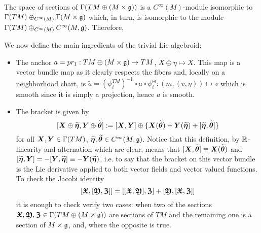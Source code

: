 The space of sections of $\Gamma(TM \oplus (M \times \mathfrak{g}))$ is a $C^\infty(M)$-module isomorphic to $\Gamma(TM) \oplus_{C^\infty(M)}\Gamma(M \times \mathfrak{g})$ which, in turn, is isomorphic to the module $\Gamma(TM) \oplus_{C^\infty(M)} C^\infty(M, \mathfrak{g})$. Therefore, 

We now define the main ingredients of the trivial Lie algebroid:
    \begin{itemize}
    \item The anchor $a = pr_1: TM \oplus (M \times \mathfrak{g}) \to TM$, $X \oplus \eta \mapsto X$. This map is a vector bundle map as it clearly respects the fibers and, locally on a neighborhood chart, is $\tilde a = (\psi^{TM}_i)^{-1} \circ a \circ \psi^{\oplus}_i: (m, (v, \eta)) \mapsto v$ which is smooth since it is simply a projection, hence $a$ is smooth.
    
    \item The bracket is given by 
    \[
        [\bm{X} \oplus \widetilde{\bm{\eta}}, \bm{Y} \oplus \widetilde{\bm{\theta}}] := [\bm{X}, \bm{Y}] \oplus \{\bm{X}(\widetilde{\bm{\theta}}) - \bm{Y}(\widetilde{\bm{\eta}}) + [\widetilde{\bm{\eta}}, \widetilde{\bm{\theta}}]\}
    \]
    for all $\bm{X}, \bm{Y} \in \Gamma(TM)$, $\widetilde{\bm{\eta}}, \widetilde{\bm{\theta}} \in C^\infty(M, \mathfrak{g})$.%
    Notice that this definition, by $\mathbb{R}$-linearity and alternation which are clear, means that $[\bm{X}, \widetilde{\bm{\theta}}] \equiv \bm{X}(\widetilde{\bm{\theta}})$ and $[\widetilde{\bm{\eta}}, \bm{Y}] = - [\bm{Y}, \widetilde{\bm{\eta}}] \equiv -\bm{Y}(\widetilde{\bm{\eta}})$, i.e. to say that the bracket on this vector bundle is the Lie derivative applied to both vector fields and vector valued functions. %
    To check the Jacobi identity
    \[ [\bm{\mathfrak{X}}, [\bm{\mathfrak{Y}}, \bm{\mathfrak{Z}}]] = [[\bm{\mathfrak{X}}, \bm{\mathfrak{Y}}], \bm{\mathfrak{Z}}] + [\bm{\mathfrak{Y}}, [\bm{\mathfrak{X}}, \bm{\mathfrak{Z}}]] \] it is enough to check verify two cases: when two of the sections $\bm{\mathfrak{X}}, \bm{\mathfrak{Y}}, \bm{\mathfrak{Z}} \in \Gamma(TM \oplus (M \times \mathfrak{g}))$ are sections of $TM$ and the remaining one is a section of $M \times \mathfrak{g}$, and, where the opposite is true.
    \end{itemize}

